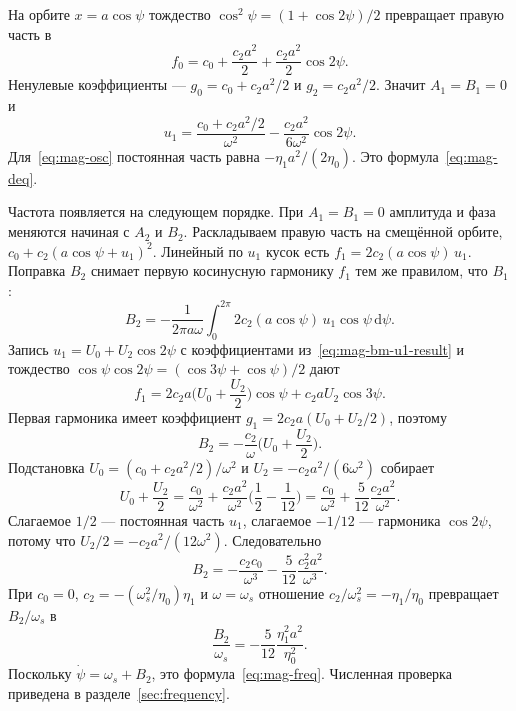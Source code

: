 \documentclass[aps,pra,preprint,a4paper,amsmath,amssymb,longbibliography]{revtex4-2}
\begin{document}
На орбите $x=a\cos\psi$ тождество $\cos^2\psi=(1+\cos 2\psi)/2$ превращает правую часть в
\begin{equation}
\label{eq:mag-bm-f0}
f_0=c_0+\frac{c_2 a^2}{2}+\frac{c_2 a^2}{2}\cos 2\psi.
\end{equation}
Ненулевые коэффициенты --- $g_0=c_0+c_2 a^2/2$ и $g_2=c_2 a^2/2$. Значит $A_1=B_1=0$ и
\begin{equation}
\label{eq:mag-bm-u1-result}
u_1
=\frac{c_0+c_2 a^2/2}{\omega^2}
-\frac{c_2 a^2}{6\omega^2}\cos 2\psi.
\end{equation}
Для~\eqref{eq:mag-osc} постоянная часть равна $-\eta_1 a^2/(2\eta_0)$. Это формула~\eqref{eq:mag-deq}.

Частота появляется на следующем порядке. При $A_1=B_1=0$ амплитуда и фаза меняются начиная с $A_2$ и $B_2$. Раскладываем правую часть на смещённой орбите, $c_0+c_2(a\cos\psi+u_1)^2$. Линейный по $u_1$ кусок есть $f_1=2c_2(a\cos\psi)\,u_1$. Поправка $B_2$ снимает первую косинусную гармонику $f_1$ тем же правилом, что $B_1$:
\begin{equation}
\label{eq:mag-bm-B2}
B_2=-\frac{1}{2\pi a\omega}
\int_0^{2\pi}2c_2(a\cos\psi)\,u_1\cos\psi\,\mathrm{d}\psi.
\end{equation}
Запись $u_1=U_0+U_2\cos 2\psi$ с коэффициентами из~\eqref{eq:mag-bm-u1-result} и тождество $\cos\psi\cos 2\psi=(\cos 3\psi+\cos\psi)/2$ дают
\begin{equation}
\label{eq:mag-bm-f1}
f_1=2c_2 a\Biggl(U_0+\frac{U_2}{2}\Biggr)\cos\psi
+c_2 a U_2\cos 3\psi.
\end{equation}
Первая гармоника имеет коэффициент $g_1=2c_2 a(U_0+U_2/2)$, поэтому
\begin{equation}
\label{eq:mag-bm-B2-alg}
B_2=-\frac{c_2}{\omega}\Biggl(U_0+\frac{U_2}{2}\Biggr).
\end{equation}
Подстановка $U_0=(c_0+c_2 a^2/2)/\omega^2$ и $U_2=-c_2 a^2/(6\omega^2)$ собирает
\begin{equation}
\label{eq:mag-bm-Usum}
U_0+\frac{U_2}{2}
=\frac{c_0}{\omega^2}+\frac{c_2 a^2}{\omega^2}\Biggl(\frac{1}{2}-\frac{1}{12}\Biggr)
=\frac{c_0}{\omega^2}+\frac{5}{12}\frac{c_2 a^2}{\omega^2}.
\end{equation}
Слагаемое $1/2$ --- постоянная часть $u_1$, слагаемое $-1/12$ --- гармоника $\cos 2\psi$, потому что $U_2/2=-c_2 a^2/(12\omega^2)$. Следовательно
\begin{equation}
\label{eq:mag-bm-B2-result}
B_2=-\frac{c_2 c_0}{\omega^3}-\frac{5}{12}\frac{c_2^2 a^2}{\omega^3}.
\end{equation}
При $c_0=0$, $c_2=-(\omega_s^2/\eta_0)\eta_1$ и $\omega=\omega_s$ отношение $c_2/\omega_s^2=-\eta_1/\eta_0$ превращает $B_2/\omega_s$ в
\begin{equation}
\label{eq:mag-bm-rel}
\frac{B_2}{\omega_s}
=-\frac{5}{12}\frac{\eta_1^2 a^2}{\eta_0^2}.
\end{equation}
Поскольку $\dot\psi=\omega_s+B_2$, это формула~\eqref{eq:mag-freq}. Численная проверка приведена в разделе~\ref{sec:frequency}.
\end{document}
